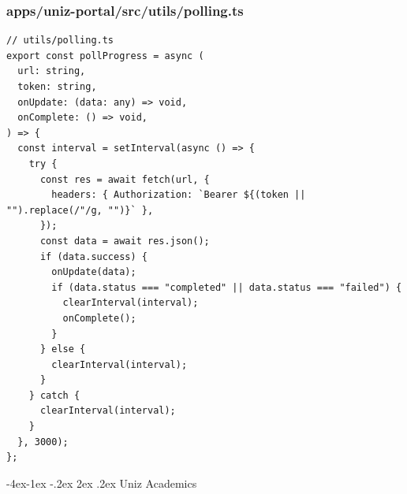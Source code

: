 \documentclass[11pt,a4paper,oneside]{article}
\makeatletter
\renewcommand{\subsection}{\@startsection{subsection}{2}{\z@}%
    {-4ex\@plus -1ex \@minus -.2ex}%
    {2ex \@plus .2ex}%
    {\normalfont\Large\bfseries\color{accent}}}
\makeatother
\begin{document}
\subsubsection*{apps/uniz-portal/src/utils/polling.ts}
\begin{lstlisting}
// utils/polling.ts
export const pollProgress = async (
  url: string,
  token: string,
  onUpdate: (data: any) => void,
  onComplete: () => void,
) => {
  const interval = setInterval(async () => {
    try {
      const res = await fetch(url, {
        headers: { Authorization: `Bearer ${(token || "").replace(/"/g, "")}` },
      });
      const data = await res.json();
      if (data.success) {
        onUpdate(data);
        if (data.status === "completed" || data.status === "failed") {
          clearInterval(interval);
          onComplete();
        }
      } else {
        clearInterval(interval);
      }
    } catch {
      clearInterval(interval);
    }
  }, 3000);
};

\end{lstlisting}

\subsection{Uniz Academics}
\end{document}
